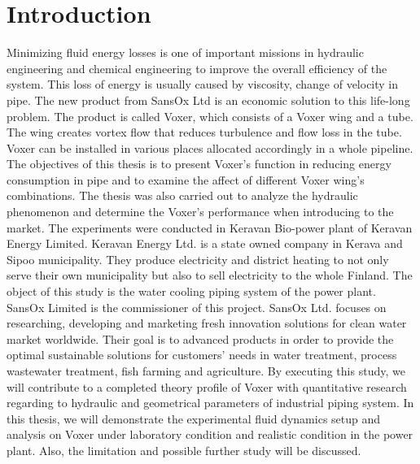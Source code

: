 
\chapter{Introduction}

Minimizing fluid energy losses is one of important missions in hydraulic engineering and chemical engineering to improve the overall efficiency of the system. This loss of energy is usually caused by viscosity, change of velocity in pipe. \newline
The new product from SansOx Ltd is an economic solution to this life-long problem. The product is called Voxer, which consists of a Voxer wing and a tube. The wing creates vortex flow that reduces turbulence and flow loss in the tube. Voxer can be installed in various places allocated accordingly in a whole pipeline.  \newline
The objectives of this thesis is to present Voxer's function in reducing energy consumption in pipe and to examine the affect of different Voxer wing's combinations. The thesis was also carried out to analyze the hydraulic phenomenon and determine the Voxer's performance when introducing to the market. \newline
The experiments were conducted in Keravan Bio-power plant of Keravan Energy Limited. Keravan Energy Ltd. is a state owned company in Kerava and Sipoo municipality. They produce electricity and district heating to not only serve their own municipality but also to sell electricity to the whole Finland. The object of this study is the water cooling piping system of the power plant.\newline
SansOx Limited is the commissioner of this project. SansOx Ltd. focuses on researching, developing and marketing fresh innovation solutions for clean water market worldwide. Their goal is to advanced products in order to provide the optimal sustainable solutions for customers' needs in water treatment, process wastewater treatment, fish farming and agriculture. By executing this study, we will contribute to a completed theory profile of Voxer with quantitative research regarding to hydraulic and geometrical parameters of industrial piping system. \newline
In this thesis, we will demonstrate the experimental fluid dynamics setup and analysis on Voxer under laboratory condition and realistic condition in the power plant. Also, the limitation and possible further study will be discussed. 

\clearpage %
